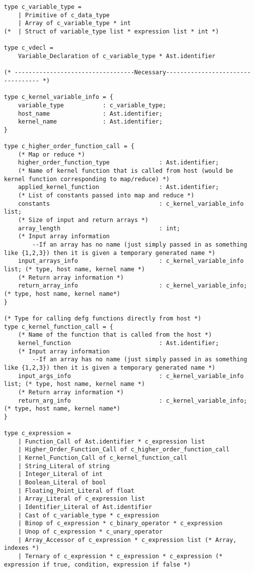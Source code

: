 \begin{verbatim}
type c_variable_type = 
	| Primitive of c_data_type
	| Array of c_variable_type * int
(* 	| Struct of variable_type list * expression list * int *)

type c_vdecl = 
    Variable_Declaration of c_variable_type * Ast.identifier

(* ----------------------------------Necessary---------------------------------- *)

type c_kernel_variable_info = {
	variable_type 			: c_variable_type;
	host_name 				: Ast.identifier;
	kernel_name 			: Ast.identifier;
}

type c_higher_order_function_call = {
	(* Map or reduce *)
	higher_order_function_type 				: Ast.identifier; 
	(* Name of kernel function that is called from host (would be kernel function corresponding to map/reduce) *)
    applied_kernel_function    				: Ast.identifier;
	(* List of constants passed into map and reduce *)
	constants 								: c_kernel_variable_info list;
	(* Size of input and return arrays *)
	array_length 							: int;
	(* Input array information 
		--If an array has no name (just simply passed in as something like {1,2,3}) then it is given a temporary generated name *)
	input_arrays_info						: c_kernel_variable_info list; (* type, host name, kernel name *)
    (* Return array information *)	
    return_array_info              			: c_kernel_variable_info; (* type, host name, kernel name*)    
}

(* Type for calling defg functions directly from host *)
type c_kernel_function_call = {
	(* Name of the function that is called from the host *)
	kernel_function 						: Ast.identifier; 
	(* Input array information 
		--If an array has no name (just simply passed in as something like {1,2,3}) then it is given a temporary generated name *)
	input_args_info							: c_kernel_variable_info list; (* type, host name, kernel name *)
    (* Return array information *)
    return_arg_info              			: c_kernel_variable_info; (* type, host name, kernel name*)
}

type c_expression =
    | Function_Call of Ast.identifier * c_expression list
    | Higher_Order_Function_Call of c_higher_order_function_call
    | Kernel_Function_Call of c_kernel_function_call
    | String_Literal of string
    | Integer_Literal of int
    | Boolean_Literal of bool
    | Floating_Point_Literal of float
    | Array_Literal of c_expression list
    | Identifier_Literal of Ast.identifier 
    | Cast of c_variable_type * c_expression
    | Binop of c_expression * c_binary_operator * c_expression
    | Unop of c_expression * c_unary_operator
    | Array_Accessor of c_expression * c_expression list (* Array, indexes *)
    | Ternary of c_expression * c_expression * c_expression (* expression if true, condition, expression if false *)


\end{verbatim}
